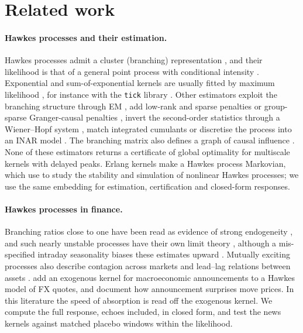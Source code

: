 \section{Related work}\label{sec:related}

\paragraph{Hawkes processes and their estimation.} Hawkes processes \citep{hawkes1971spectra} admit
a cluster (branching) representation \citep{hawkes1974cluster}, and their likelihood is that of a
general point process with conditional intensity \citep{daley2003introduction}. Exponential and
sum-of-exponential kernels are usually fitted by maximum likelihood \citep{bacry2015hawkes}, for
instance with the \texttt{tick} library \citep{bacry2018tick}. Other estimators exploit the
branching structure through EM \citep{veen2008estimation}, add low-rank and sparse penalties
\citep{zhou2013learning} or group-sparse Granger-causal penalties \citep{xu2016learning}, invert
the second-order statistics through a Wiener--Hopf system
\citep{bacry2012nonparametric,bacry2016first,bacry2016estimation}, match integrated cumulants
\citep{achab2017uncovering} or discretise the process into an INAR model
\citep{kirchner2017estimation}. The branching matrix also defines a graph of causal influence
\citep{embrechts2018hawkes}. None of these estimators returns a certificate of global optimality for
multiscale kernels with delayed peaks. Erlang kernels make a Hawkes process Markovian, which
\citet{duarte2019stability} use to study the stability and simulation of nonlinear Hawkes
processes; we use the same embedding for estimation, certification and closed-form responses.

\paragraph{Hawkes processes in finance.} Branching ratios close to one have been read as evidence of
strong endogeneity \citep{filimonov2012quantifying,hardiman2013critical}, and such nearly unstable
processes have their own limit theory \citep{jaisson2015limit}, although a mis-specified
intraday seasonality biases these estimates upward \citep{filimonov2015apparent,omi2017hawkes}.
Mutually exciting processes also describe contagion across markets \citep{aitsahalia2015modeling}
and lead--lag relations between assets \citep{huth2014high}. \citet{rambaldi2015modeling} add an
exogenous kernel for macroeconomic announcements to a Hawkes model of FX quotes, and
\citet{andersen2003micro} document how announcement surprises move prices. In this literature the
speed of absorption is read off the exogenous kernel. We compute the full response, echoes
included, in closed form, and test the news kernels against matched placebo windows within the
likelihood.

